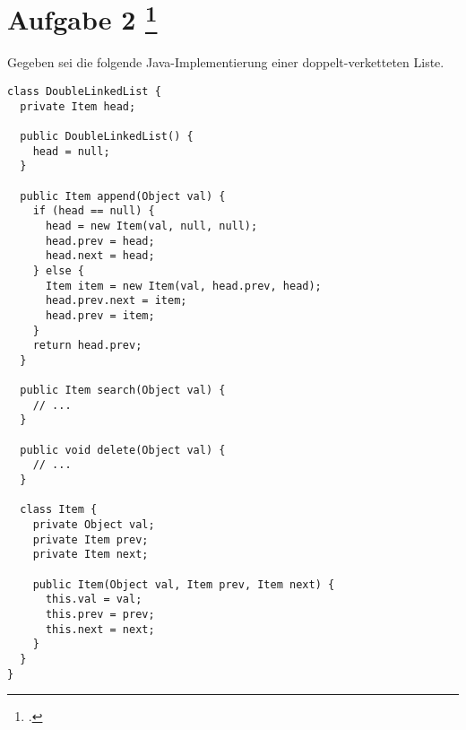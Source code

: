\documentclass{lehramt-informatik-aufgabe}
\begin{document}
\let\j=\liJavaCode
{}
\section{Aufgabe 2
\footcite{66115:2021:03}}

Gegeben sei die folgende Java-Implementierung einer doppelt-verketteten
Liste.

\begin{verbatim}
class DoubleLinkedList {
  private Item head;

  public DoubleLinkedList() {
    head = null;
  }

  public Item append(Object val) {
    if (head == null) {
      head = new Item(val, null, null);
      head.prev = head;
      head.next = head;
    } else {
      Item item = new Item(val, head.prev, head);
      head.prev.next = item;
      head.prev = item;
    }
    return head.prev;
  }

  public Item search(Object val) {
    // ...
  }

  public void delete(Object val) {
    // ...
  }

  class Item {
    private Object val;
    private Item prev;
    private Item next;

    public Item(Object val, Item prev, Item next) {
      this.val = val;
      this.prev = prev;
      this.next = next;
    }
  }
}
\end{verbatim}
\end{document}
